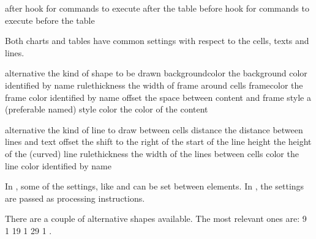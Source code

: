 \starttabulate[|Tl|l|]
\HL
\NC {} \NC \NC \NR
\HL
\NC after     \NC hook for commands to execute after the table \NC \NR
\NC before    \NC hook for commands to execute before the table \NC \NR
\HL
\stoptabulate

Both charts and tables have common settings with respect to the cells, texts and
lines.

\starttabulate[|Tl|l|]
\HL
\NC {} \NC \NC \NR
\HL
\NC alternative   \NC the kind of shape to be drawn \NC \NR
\NC backgroundcolor \NC the background color identified by name \NC \NR
\NC rulethickness   \NC the width of frame around cells \NC \NR
\NC framecolor      \NC the frame color identified by name \NC \NR
\NC offset          \NC the space between content and frame \NC \NR
\NC style           \NC a (preferable named) style \NC \NR
\NC color           \NC the color of the content \NC \NR
\HL
\stoptabulate

\starttabulate[|Tl|l|]
\HL
\NC {} \NC \NC \NR
\HL
\NC alternative   \NC the kind of line to draw between cells \NC \NR
\NC distance      \NC the distance between lines and text \NC \NR
\NC offset        \NC the shift to the right of the start of the line \NC \NR
\NC height        \NC the height of the (curved) line \NC \NR
\NC rulethickness \NC the width of the lines between cells \NC \NR
\NC color         \NC the line color identified by name \NC \NR
\HL
\stoptabulate

In \TEX, some of the settings, like  and  can be set
between elements. In \XML, the settings are passed as processing instructions.

\startbuffer
\startSTEPchart
{}
   
   
\start
    \setupSTEPcells[color=darkred,style=bold]
     
      
\stop
{}
\stopSTEPchart
\stopbuffer

\typebuffer \getbuffer

There are a couple of alternative shapes available. The most relevant ones are:
\removeunwantedspaces {} {9} {1} { \TestShape {\recurselevel}}
\removeunwantedspaces {} {19} {1} { \TestShape {\recurselevel}}
\removeunwantedspaces {} {29} {1} { \TestShape {\recurselevel}}.


